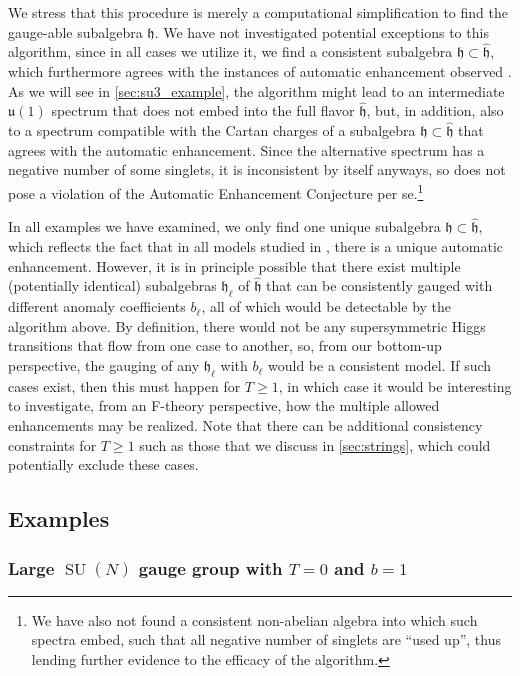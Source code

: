 \documentclass[11pt, a4paper]{article}
\newcommand*{\fkh}{\ensuremath{\mathfrak{h}}}
\DeclareMathOperator{\SU}{SU}
\newcommand*{\fku}{\ensuremath{\mathfrak{u}}}
\begin{document}
We stress that this procedure is merely a computational simplification to find the gauge-able subalgebra $\fkh$.
We have not investigated potential exceptions to this algorithm, since in all cases we utilize it, we find a consistent subalgebra $\fkh \subset \hat{\fkh}$, which furthermore agrees with the instances of automatic enhancement observed \cite{Raghuram:2020vxm}.
As we will see in \cref{sec:su3_example}, the algorithm might lead to an intermediate $\fku(1)$ spectrum that does not embed into the full flavor $\hat{\fkh}$, but, in addition, also to a spectrum compatible with the Cartan charges of a subalgebra $\fkh \subset \hat{\fkh}$ that agrees with the automatic enhancement.
Since the alternative spectrum has a negative number of some singlets, it is inconsistent by itself anyways, so does not pose a violation of the Automatic Enhancement Conjecture per se.\footnote{We have also not found a consistent non-abelian algebra into which such spectra embed, such that all negative number of singlets are ``used up'', thus lending further evidence to the efficacy of the algorithm.}



In all examples we have examined, we only find one unique subalgebra $\fkh \subset \hat{\fkh}$, which reflects the fact that in all models studied in \cite{Raghuram:2020vxm}, there is a unique automatic enhancement.
However, it is in principle possible that there exist multiple (potentially identical) subalgebras $\fkh_\ell$ of $\hat{\fkh}$ that can be consistently gauged with different anomaly coefficients $b_\ell$, all of which would be detectable by the algorithm above.
By definition, there would not be any supersymmetric Higgs transitions that flow from one case to another, so, from our bottom-up perspective, the gauging of any $\fkh_\ell$ with $b_\ell$ would be a consistent model.
If such cases exist, then this must happen for $T \ge 1$, in which case it would be interesting to investigate, from an F-theory perspective, how the multiple allowed enhancements may be realized.
Note that there can be additional consistency constraints for $T \ge 1$ such as those that we discuss in \cref{sec:strings}, which could potentially exclude these cases.


\subsection{Examples}
\subsubsection{Large \texorpdfstring{$\SU(N)$}{SU(N)} gauge group with \texorpdfstring{$T = 0$}{T=0} and \texorpdfstring{$b = 1$}{b=1}}
\end{document}
